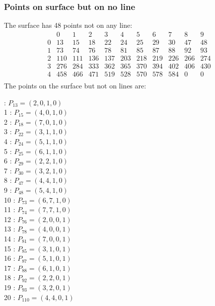 \documentclass{article}
\begin{document}
{\subsubsection*{Points on surface but on no line}
The surface has 48 points not on any line:\\
$$
\begin{array}{r|*{10}{r}}
 & 0 & 1 & 2 & 3 & 4 & 5 & 6 & 7 & 8 & 9\\
\hline
0 & 13 & 15 & 18 & 22 & 24 & 25 & 29 & 30 & 47 & 48\\
1 & 73 & 74 & 76 & 78 & 81 & 85 & 87 & 88 & 92 & 93\\
2 & 110 & 111 & 136 & 137 & 203 & 218 & 219 & 226 & 266 & 274\\
3 & 276 & 284 & 333 & 362 & 365 & 370 & 394 & 402 & 406 & 430\\
4 & 458 & 466 & 471 & 519 & 528 & 570 & 578 & 584 & 0 & 0\\
\end{array}
$$
The points on the surface but not on lines are:\\
\begin{multicols}{2}
 : $P_{13}=( 2, 0, 1, 0 )$\\
1 : $P_{15}=( 4, 0, 1, 0 )$\\
2 : $P_{18}=( 7, 0, 1, 0 )$\\
3 : $P_{22}=( 3, 1, 1, 0 )$\\
4 : $P_{24}=( 5, 1, 1, 0 )$\\
5 : $P_{25}=( 6, 1, 1, 0 )$\\
6 : $P_{29}=( 2, 2, 1, 0 )$\\
7 : $P_{30}=( 3, 2, 1, 0 )$\\
8 : $P_{47}=( 4, 4, 1, 0 )$\\
9 : $P_{48}=( 5, 4, 1, 0 )$\\
10 : $P_{73}=( 6, 7, 1, 0 )$\\
11 : $P_{74}=( 7, 7, 1, 0 )$\\
12 : $P_{76}=( 2, 0, 0, 1 )$\\
13 : $P_{78}=( 4, 0, 0, 1 )$\\
14 : $P_{81}=( 7, 0, 0, 1 )$\\
15 : $P_{85}=( 3, 1, 0, 1 )$\\
16 : $P_{87}=( 5, 1, 0, 1 )$\\
17 : $P_{88}=( 6, 1, 0, 1 )$\\
18 : $P_{92}=( 2, 2, 0, 1 )$\\
19 : $P_{93}=( 3, 2, 0, 1 )$\\
20 : $P_{110}=( 4, 4, 0, 1 )$\\

\end{multicols}}
\end{document}

